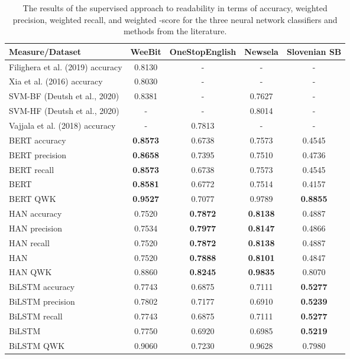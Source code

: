 \documentclass{clv3}
\begin{document}
\begin{table*}[b]
\begin{center}
\caption{The results of the supervised approach to readability in terms of accuracy, weighted precision, weighted recall, and weighted -score for the three neural network classifiers and  methods from the literature.} 
\begin{tabular}{lcccc}
  Measure/Dataset & WeeBit & OneStopEnglish & Newsela & Slovenian SB\\
  \hline
  Filighera et al. (2019) accuracy & 0.8130 & - & - & -  \\
Xia et al. (2016) accuracy & 0.8030 & - & - & -  \\
  SVM-BF (Deutsh et al., 2020)  & 0.8381 & - & 0.7627 & -  \\
  SVM-HF (Deutsh et al., 2020)  &  - & - & 0.8014 & -  \\
  Vajjala et al. (2018) accuracy & - & 0.7813 & - & - \\
  
  \hline     
    BERT accuracy & \textbf{0.8573} & 0.6738 & 0.7573 & 0.4545 \\
    BERT precision & \textbf{0.8658} & 0.7395 & 0.7510 & 0.4736 \\
    BERT recall & \textbf{0.8573} & 0.6738 & 0.7573 & 0.4545 \\
    BERT  & \textbf{0.8581} & 0.6772 & 0.7514 & 0.4157 \\
    BERT QWK & \textbf{0.9527} & 0.7077 & 0.9789 & \textbf{0.8855} \\
  \hline
    HAN accuracy & 0.7520 & \textbf{0.7872} & \textbf{0.8138} &  0.4887 \\
    HAN precision & 0.7534 & \textbf{0.7977} & \textbf{ 0.8147} & 0.4866 \\
    HAN recall & 0.7520 & \textbf{0.7872} & \textbf{0.8138} & 0.4887 \\
    HAN  & 0.7520 & \textbf{0.7888} & \textbf{0.8101} & 0.4847 \\
    HAN QWK & 0.8860 & \textbf{0.8245} & \textbf{0.9835} &0.8070 \\
  \hline
    BiLSTM accuracy & 0.7743 & 0.6875 & 0.7111 & \textbf{0.5277}\\
    BiLSTM precision & 0.7802 & 0.7177 & 0.6910 & \textbf{0.5239}\\
    BiLSTM recall & 0.7743 & 0.6875 & 0.7111 &  \textbf{0.5277}\\
    BiLSTM  & 0.7750 & 0.6920 & 0.6985 & \textbf{0.5219}\\
    BiLSTM QWK & 0.9060 & 0.7230 & 0.9628 & 0.7980\\
  \hline
\end{tabular}
\label{table:supervisedResults}
 \end{center}
\end{table*}
\end{document}
